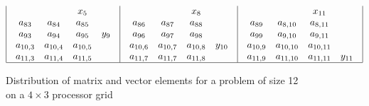 \begin{figure}[ht]
{\[\begin{array}{| c | c | c | c |}
\begin{array}{c c c c}
&&x_5\\
a_{83} &   a_{84} &  a_{85} & \\
a_{93} &   a_{94} &  a_{95} & y_9\\
a_{10,3} & a_{10,4} &a_{10,5} & \\
a_{11,3} & a_{11,4} &a_{11,5} & \\
\end{array}
&
\begin{array}{c c c c}
&&x_8\\
a_{86} &   a_{87} &  a_{88} & \\
a_{96} &   a_{97} &  a_{98} & \\
a_{10,6} & a_{10,7} &a_{10,8} & y_{10} \\
a_{11,7} & a_{11,7} &a_{11,8} & \\
\end{array}
&
\begin{array}{c c c c}
&&x_{11}\\
a_{89} &   a_{8,10} &  a_{8,11} & \\
a_{99} &   a_{9,10} &  a_{9,11} & \\
a_{10,9} & a_{10,10} & a_{10,11} & \\
a_{11,9} & a_{11,10} & a_{11,11} & y_{11} \\
\end{array}
\\ \hline
\end{array}
\]
}
\caption{Distribution of matrix and vector elements for a problem of size 12 on a $4\times 3$ processor grid}
\label{fig:2dmatrix}
\end{figure}

